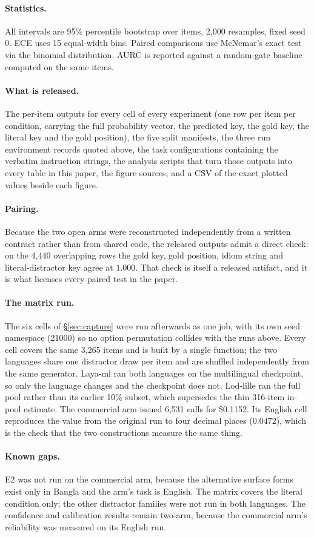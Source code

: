 \documentclass[11pt]{article}
\begin{document}
\paragraph{Statistics.} All intervals are 95\% percentile bootstrap over items,
2{,}000 resamples, fixed seed 0. ECE uses 15 equal-width bins. Paired
comparisons use McNemar's exact test via the binomial distribution. AURC is
reported against a random-gate baseline computed on the same items.

\paragraph{What is released.} The per-item outputs for every cell of every
experiment (one row per item per condition, carrying the full probability
vector, the predicted key, the gold key, the literal key and the gold position),
the five split manifests, the three run environment records quoted above, the
task configurations containing the verbatim instruction strings, the analysis
scripts that turn those outputs into every table in this paper, the figure
sources, and a CSV of the exact plotted values beside each figure.

\paragraph{Pairing.} Because the two open arms were reconstructed independently
from a written contract rather than from shared code, the released outputs admit
a direct check: on the 4{,}440 overlapping rows the gold key, gold position,
idiom string and literal-distractor key agree at $1.000$. That check is itself a
released artifact, and it is what licenses every paired test in the paper.

\paragraph{The matrix run.} The six cells of \S\ref{sec:capture} were run
afterwards as one job, with its own seed namespace (21000) so no option
permutation collides with the runs above. Every cell covers the same 3{,}265
items and is built by a single function; the two languages share one distractor
draw per item and are shuffled independently from the same generator. Laya-ml
ran both languages on the multilingual checkpoint, so only the language changes
and the checkpoint does not. Lod-lille ran the full pool rather than its earlier
10\% subset, which supersedes the thin 316-item in-pool estimate. The
commercial arm issued 6{,}531 calls for \$0.1152. Its English cell reproduces
the value from the original run to four decimal places ($0.0472$), which is the
check that the two constructions measure the same thing.

\paragraph{Known gaps.} E2 was not run on the commercial arm, because the
alternative surface forms exist only in Bangla and the arm's task is English.
The matrix covers the literal condition only; the other distractor families were
not run in both languages. The confidence and calibration results remain
two-arm, because the commercial arm's reliability was measured on its English
run.
\end{document}
